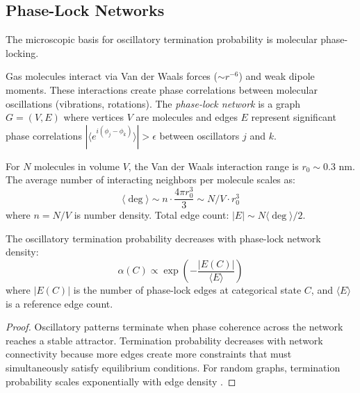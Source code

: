 \subsection{Phase-Lock Networks}

The microscopic basis for oscillatory termination probability is molecular phase-locking.

\begin{definition}
Gas molecules interact via Van der Waals forces ($\sim r^{-6}$) and weak dipole moments. These interactions create phase correlations between molecular oscillations (vibrations, rotations). The \emph{phase-lock network} is a graph $G = (V, E)$ where vertices $V$ are molecules and edges $E$ represent significant phase correlations $|\langle e^{i(\phi_j - \phi_k)}\rangle| > \epsilon$ between oscillators $j$ and $k$.
\end{definition}

\begin{proposition}
For $N$ molecules in volume $V$, the Van der Waals interaction range is $r_0 \sim 0.3$ nm. The average number of interacting neighbors per molecule scales as:
\begin{equation}
\langle \deg \rangle \sim n \cdot \frac{4\pi r_0^3}{3} \sim N/V \cdot r_0^3
\end{equation}
where $n = N/V$ is number density. Total edge count: $|E| \sim N \langle \deg \rangle / 2$.
\end{proposition}

\begin{theorem}
\label{thm:alpha_topology}
The oscillatory termination probability decreases with phase-lock network density:
\begin{equation}
\alpha(C) \propto \exp\left(-\frac{|E(C)|}{\langle E \rangle}\right)
\end{equation}
where $|E(C)|$ is the number of phase-lock edges at categorical state $C$, and $\langle E \rangle$ is a reference edge count.
\end{theorem}

\begin{proof}
Oscillatory patterns terminate when phase coherence across the network reaches a stable attractor. Termination probability decreases with network connectivity because more edges create more constraints that must simultaneously satisfy equilibrium conditions. For random graphs, termination probability scales exponentially with edge density \cite{kuramoto1975,strogatz2000}.
\end{proof}

